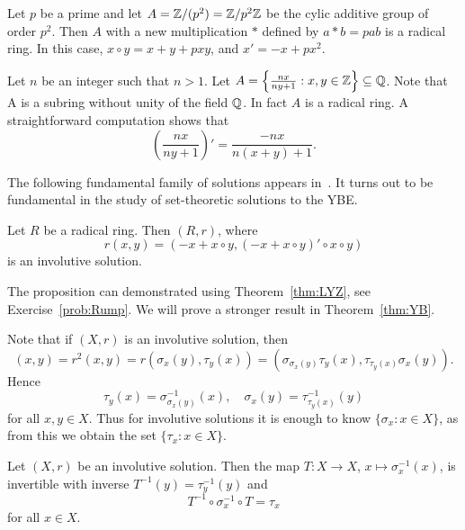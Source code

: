 

\begin{example}
	Let $p$ be a prime and let $A=\mathbb{Z}/(p^2)=\mathbb{Z}/p^2\mathbb{Z}$ be the cylic additive group of order $p^2$. 
	Then $A$ with a new multiplication $*$ defined by $a*b=pab$ is a radical ring. In this case, $x\circ y=x+y+pxy$, and $x'=-x+px^2$. 
\end{example}

\begin{example}
	Let $n$ be an integer such that $n>1$. Let $A=\left\{\frac{nx}{ny+1}:x,y\in\mathbb{Z}\right\}\subseteq \mathbb{Q}$. Note that A is a subring without unity of the field $\mathbb{Q}$. In fact $A$ is a radical ring. A straightforward computation shows that 
	\[
	\left(\frac{nx}{ny+1}\right)'=\frac{-nx}{n(x+y)+1}.
	\]
\end{example}

The following fundamental family of solutions appears in~\cite{MR2278047}. 
It turns out to be fundamental in the study of 
set-theoretic solutions to the YBE. 

\begin{proposition}
	\label{pro:Rump}
	Let $R$ be a radical ring. Then $(R,r)$, where 
	\[
	r(x,y)=( -x+x\circ y,(-x+x\circ y)'\circ x\circ y)
	\]
	is an involutive solution.
\end{proposition}

The proposition can demonstrated using Theorem~\ref{thm:LYZ}, 
see Exercise~\ref{prob:Rump}. 
We will prove a stronger result in Theorem~\ref{thm:YB}. 

Note that if $(X,r)$ is an  involutive solution, then 
\[
(x,y)=r^2(x,y)=r(\sigma_x(y),\tau_y(x))=(\sigma_{\sigma_x(y)}\tau_y(x),\tau_{\tau_y(x)}\sigma_x(y)).
\]
Hence 
\begin{equation}
	\label{eq:involutive}
	\tau_y(x)=\sigma_{\sigma_x(y)}^{-1}(x),
	\quad
	\sigma_x(y)=\tau_{\tau_y(x)}^{-1}(y)
\end{equation}
for all $x,y\in X$. Thus for involutive solutions
it is enough to know $\{\sigma_x:x\in X\}$, as from this we obtain the
set $\{\tau_x:x\in X\}$. 


\begin{proposition}
	\label{pro:T}
	Let $(X,r)$ be an involutive solution. 
	Then the map $T\colon X\to X$, $x\mapsto\sigma_x^{-1}(x)$, is 
	invertible with inverse $T^{-1}(y)=\tau^{-1}_y(y)$ and 
	\[
	T^{-1}\circ\sigma_x^{-1}\circ T=\tau_x
	\]
	for all $x\in X$. 
\end{proposition}

